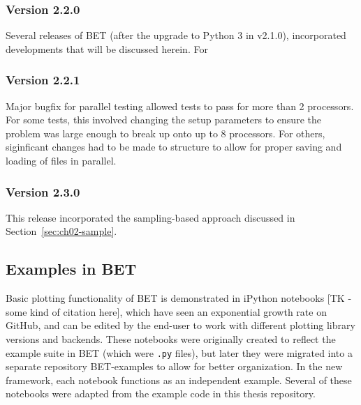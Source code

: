 \subsubsection{Version 2.2.0}
Several releases of BET (after the upgrade to Python 3 in v2.1.0), incorporated developments that will be discussed herein.
For


\subsubsection{Version 2.2.1}
Major bugfix for parallel testing allowed tests to pass for more than 2 processors.
For some tests, this involved changing the setup parameters to ensure the problem was large enough to break up onto up to 8 processors.
For others, siginficant changes had to be made to structure to allow for proper saving and loading of files in parallel.


\subsubsection{Version 2.3.0}
This release incorporated the sampling-based approach discussed in Section~\ref{sec:ch02-sample}.


\subsection{Examples in BET}
Basic plotting functionality of BET is demonstrated in iPython notebooks [TK - some kind of citation here], which have seen an exponential growth rate on GitHub, and can be edited by the end-user to work with different plotting library versions and backends.
These notebooks were originally created to reflect the example suite in BET (which were {\tt .py} files), but later they were migrated into a separate repository BET-examples to allow for better organization.
In the new framework, each notebook functions as an independent example.
Several of these notebooks were adapted from the example code in this thesis repository.

